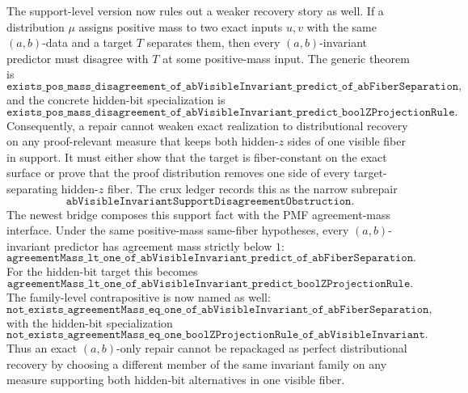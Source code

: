\documentclass[11pt]{article}
\theoremstyle{remark}
\begin{document}
The support-level version now rules out a weaker recovery story as well.  If a
distribution \(\mu\) assigns positive mass to two exact inputs \(u,v\) with the
same \((a,b)\)-data and a target \(T\) separates them, then every
\((a,b)\)-invariant predictor must disagree with \(T\) at some positive-mass
input.  The generic theorem is
\[
  \texttt{exists\_pos\_mass\_disagreement\_of\_abVisibleInvariant\_predict\_of\_abFiberSeparation},
\]
and the concrete hidden-bit specialization is
\[
  \texttt{exists\_pos\_mass\_disagreement\_of\_abVisibleInvariant\_predict\_boolZProjectionRule}.
\]
Consequently, a repair cannot weaken exact realization to distributional
recovery on any proof-relevant measure that keeps both hidden-\(z\) sides of one
visible fiber in support.  It must either show that the target is fiber-constant
on the exact surface or prove that the proof distribution removes one side of
every target-separating hidden-\(z\) fiber.  The crux ledger records this as the
narrow subrepair
\[
  \texttt{abVisibleInvariantSupportDisagreementObstruction}.
\]
The newest bridge composes this support fact with the PMF agreement-mass
interface.  Under the same positive-mass same-fiber hypotheses, every
\((a,b)\)-invariant predictor has agreement mass strictly below \(1\):
\[
  \texttt{agreementMass\_lt\_one\_of\_abVisibleInvariant\_predict\_of\_abFiberSeparation}.
\]
For the hidden-bit target this becomes
\[
  \texttt{agreementMass\_lt\_one\_of\_abVisibleInvariant\_predict\_boolZProjectionRule}.
\]
The family-level contrapositive is now named as well:
\[
  \texttt{not\_exists\_agreementMass\_eq\_one\_of\_abVisibleInvariant\_of\_abFiberSeparation},
\]
with the hidden-bit specialization
\[
  \texttt{not\_exists\_agreementMass\_eq\_one\_boolZProjectionRule\_of\_abVisibleInvariant}.
\]
Thus an exact \((a,b)\)-only repair cannot be repackaged as perfect
distributional recovery by choosing a different member of the same invariant
family on any measure supporting both hidden-bit alternatives in one visible
fiber.
\end{document}
